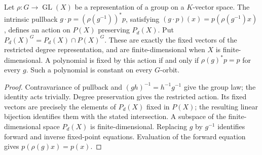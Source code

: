 \begin{lemma}
\label{lem:balanced-polynomial-action}
\leanok
{}
Let $\rho:G\to\operatorname{GL}(X)$ be a representation of a group on a
$K$-vector space. The intrinsic pullback $g\cdot p=(\rho(g^{-1}))^*p$, satisfying
$(g\cdot p)(x)=p(\rho(g^{-1})x)$, defines
an action on $P(X)$ preserving $P_d(X)$. Put
$P_d(X)^G=P_d(X)\cap P(X)^G$. These are exactly the fixed vectors of
the restricted degree representation, and are finite-dimensional when
$X$ is finite-dimensional. A polynomial is fixed by this action if and
only if $\rho(g)^*p=p$ for every $g$. Such a polynomial is constant
on every $G$-orbit.
\end{lemma}
\begin{proof}
Contravariance of pullback and $(gh)^{-1}=h^{-1}g^{-1}$ give the group
law; the identity acts trivially. Degree preservation gives the restricted
action. Its fixed vectors are precisely the elements of $P_d(X)$ fixed
in $P(X)$; the resulting linear bijection identifies them with the stated
intersection. A subspace of the finite-dimensional space $P_d(X)$ is
finite-dimensional. Replacing $g$ by $g^{-1}$ identifies forward and
inverse fixed-point equations. Evaluation of the forward equation gives
$p(\rho(g)x)=p(x)$.
\end{proof}

